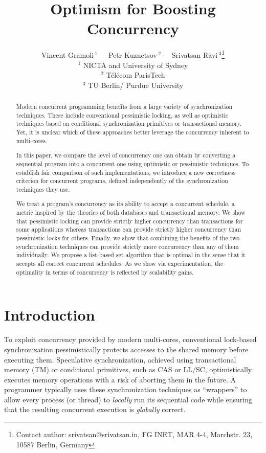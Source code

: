 \documentclass[11pt,pdftex,letterpaper]{article}
\begin{document}
\title{Optimism for Boosting Concurrency}
\author{
Vincent Gramoli\,$^1$~~~Petr Kuznetsov\,$^{2}$~~~Srivatsan Ravi\,$^3$\thanks{Contact author:
          srivatsan@srivatsan.in, FG INET, MAR 4-4, Marchstr. 23,
          10587 Berlin, Germany}\\
\small $^1$ NICTA and University of Sydney\\
\small $^2$ T\'el\'ecom ParisTech\\
\small $^3$ TU Berlin/ Purdue University
}

\date{}\maketitle
\thispagestyle{empty}

\begin{abstract}
Modern concurrent programming benefits from a large variety of synchronization techniques.
These include conventional pessimistic locking, as well as optimistic
techniques based on conditional synchronization primitives or 
transactional memory. Yet, it is unclear which of these approaches 
better leverage the concurrency inherent to multi-cores.


In this paper, we compare the level of concurrency one can obtain by converting a 
sequential program into a concurrent one using optimistic or
pessimistic techniques. 
To establish fair comparison of such implementations, we 
introduce a new correctness
criterion for concurrent programs, defined independently 
of the synchronization techniques they use. 

We treat a program's concurrency as its ability to accept a
concurrent schedule, a metric inspired by the theories of both databases
and transactional memory. We show that pessimistic locking can
provide strictly higher concurrency than transactions for some
applications whereas transactions can provide strictly higher
concurrency than pessimistic locks for others. 
Finally, we show that combining the benefits of the two synchronization techniques 
can provide  strictly more concurrency than any of them individually.
We propose a list-based set algorithm that is optimal in the sense that it accepts all
correct concurrent schedules.
As we show via experimentation, the optimality in terms of concurrency is
reflected by scalability gains.      
\end{abstract}


\newpage
{}\setcounter{page}{1}
\section{Introduction}
\label{sec:intro}
To exploit concurrency provided by modern multi-cores, conventional lock-based synchronization 
pessimistically protects accesses to  the shared memory before
executing them.
Speculative synchronization, achieved using transactional memory (TM) or
conditional primitives, such as CAS or LL/SC,  
optimistically executes memory operations with a risk of aborting them in the future.
A programmer typically uses these synchronization techniques 
as ``wrappers'' to allow every process (or thread) to \emph{locally} run its sequential code while ensuring 
that the resulting concurrent execution is \emph{globally} correct.
\end{document}
